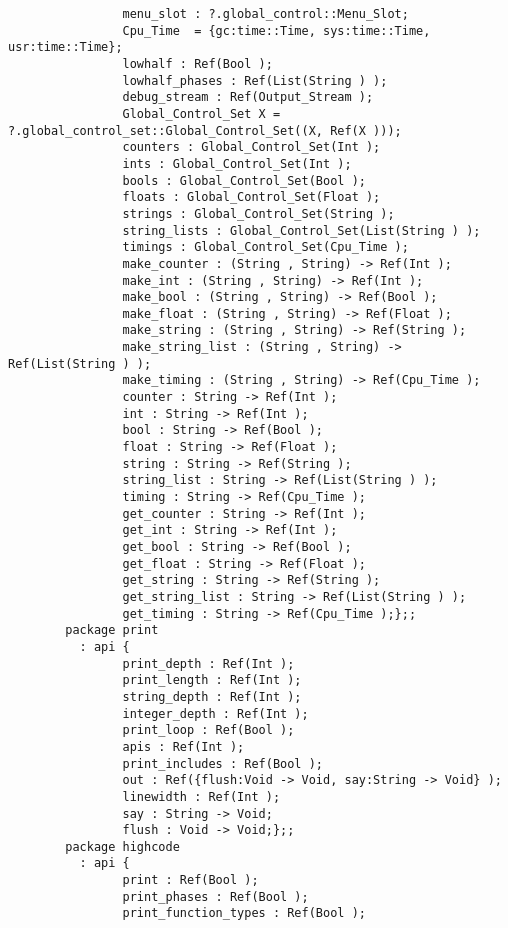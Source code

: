 \begin{verbatim}
                menu_slot : ?.global_control::Menu_Slot;
                Cpu_Time  = {gc:time::Time, sys:time::Time, usr:time::Time};
                lowhalf : Ref(Bool );
                lowhalf_phases : Ref(List(String ) );
                debug_stream : Ref(Output_Stream );
                Global_Control_Set X = ?.global_control_set::Global_Control_Set((X, Ref(X )));
                counters : Global_Control_Set(Int );
                ints : Global_Control_Set(Int );
                bools : Global_Control_Set(Bool );
                floats : Global_Control_Set(Float );
                strings : Global_Control_Set(String );
                string_lists : Global_Control_Set(List(String ) );
                timings : Global_Control_Set(Cpu_Time );
                make_counter : (String , String) -> Ref(Int );
                make_int : (String , String) -> Ref(Int );
                make_bool : (String , String) -> Ref(Bool );
                make_float : (String , String) -> Ref(Float );
                make_string : (String , String) -> Ref(String );
                make_string_list : (String , String) -> Ref(List(String ) );
                make_timing : (String , String) -> Ref(Cpu_Time );
                counter : String -> Ref(Int );
                int : String -> Ref(Int );
                bool : String -> Ref(Bool );
                float : String -> Ref(Float );
                string : String -> Ref(String );
                string_list : String -> Ref(List(String ) );
                timing : String -> Ref(Cpu_Time );
                get_counter : String -> Ref(Int );
                get_int : String -> Ref(Int );
                get_bool : String -> Ref(Bool );
                get_float : String -> Ref(Float );
                get_string : String -> Ref(String );
                get_string_list : String -> Ref(List(String ) );
                get_timing : String -> Ref(Cpu_Time );};;
        package print
          : api {
                print_depth : Ref(Int );
                print_length : Ref(Int );
                string_depth : Ref(Int );
                integer_depth : Ref(Int );
                print_loop : Ref(Bool );
                apis : Ref(Int );
                print_includes : Ref(Bool );
                out : Ref({flush:Void -> Void, say:String -> Void} );
                linewidth : Ref(Int );
                say : String -> Void;
                flush : Void -> Void;};;
        package highcode
          : api {
                print : Ref(Bool );
                print_phases : Ref(Bool );
                print_function_types : Ref(Bool );

\end{verbatim}
